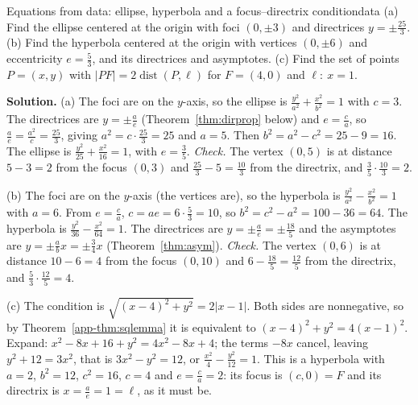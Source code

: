 \documentclass[11pt]{article}
\begin{document}
\begin{exmp}{Equations from data: ellipse, hyperbola and a focus--directrix condition}{data}
(a) Find the ellipse centered at the origin with foci $(0,\pm3)$ and directrices $y=\pm\frac{25}3$. (b) Find the hyperbola centered at the origin with vertices $(0,\pm6)$ and eccentricity $e=\frac53$, and its directrices and asymptotes. (c) Find the set of points $P=(x,y)$ with $\lvert PF\rvert=2\operatorname{dist}(P,\ell)$ for $F=(4,0)$ and $\ell:\ x=1$.

\textbf{Solution.} (a) The foci are on the $y$-axis, so the ellipse is $\frac{y^2}{a^2}+\frac{x^2}{b^2}=1$ with $c=3$. The directrices are $y=\pm\frac ae$ (Theorem~\ref{thm:dirprop} below) and $e=\frac ca$, so $\frac ae=\frac{a^2}c=\frac{25}3$, giving $a^2=c\cdot\frac{25}3=25$ and $a=5$. Then $b^2=a^2-c^2=25-9=16$. The ellipse is $\frac{y^2}{25}+\frac{x^2}{16}=1$, with $e=\frac35$. \emph{Check.} The vertex $(0,5)$ is at distance $5-3=2$ from the focus $(0,3)$ and $\frac{25}3-5=\frac{10}3$ from the directrix, and $\frac35\cdot\frac{10}3=2$.

(b) The foci are on the $y$-axis (the vertices are), so the hyperbola is $\frac{y^2}{a^2}-\frac{x^2}{b^2}=1$ with $a=6$. From $e=\frac ca$, $c=ae=6\cdot\frac53=10$, so $b^2=c^2-a^2=100-36=64$. The hyperbola is $\frac{y^2}{36}-\frac{x^2}{64}=1$. The directrices are $y=\pm\frac ae=\pm\frac{18}5$ and the asymptotes are $y=\pm\frac abx=\pm\frac34x$ (Theorem~\ref{thm:asym}). \emph{Check.} The vertex $(0,6)$ is at distance $10-6=4$ from the focus $(0,10)$ and $6-\frac{18}5=\frac{12}5$ from the directrix, and $\frac53\cdot\frac{12}5=4$.

(c) The condition is $\sqrt{(x-4)^2+y^2}=2\lvert x-1\rvert$. Both sides are nonnegative, so by Theorem~\ref{app-thm:sqlemma} it is equivalent to $(x-4)^2+y^2=4(x-1)^2$. Expand: $x^2-8x+16+y^2=4x^2-8x+4$; the terms $-8x$ cancel, leaving $y^2+12=3x^2$, that is $3x^2-y^2=12$, or $\frac{x^2}4-\frac{y^2}{12}=1$. This is a hyperbola with $a=2$, $b^2=12$, $c^2=16$, $c=4$ and $e=\frac ca=2$: its focus is $(c,0)=F$ and its directrix is $x=\frac ae=1=\ell$, as it must be.
\end{exmp}
\end{document}
